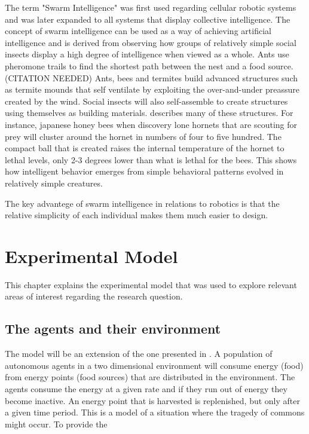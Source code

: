 \documentclass[a4paper]{book}
\begin{document}
The term "Swarm Intelligence" was first used \cite{beni_swarm_1993} regarding cellular robotic systems and was later expanded to all systems that display collective intelligence.
The concept of swarm intelligence can be used as a way of achieving artificial intelligence and is derived from observing how groups of relatively simple social insects display a high degree of intelligence when viewed as a whole. %
Ants use pheromone trails to find the shortest path between the nest and a food source. (CITATION NEEDED) 
Ants, bees and termites build advanced structures such as termite mounds that self ventilate by exploiting the over-and-under preassure created by the wind. 
Social insects will also self-assemble to create structures using themselves as building materials. 
\cite{anderson_self-assemblages_2002} describes many of these structures. 
For instance, japanese honey bees when discovery lone hornets that are scouting for prey will cluster around the hornet in numbers of four to five hundred.
The compact ball that is created raises the internal temperature of the hornet to lethal levels, only 2-3 degrees lower than what is lethal for the bees.
This shows how intelligent behavior emerges from simple behavioral patterns evolved in relatively simple creatures. %

The key advantege of swarm intelligence in relations to robotics is that the relative simplicity of each individual makes them much easier to design. 




\chapter{Experimental Model}

This chapter explains the experimental model that was used to explore relevant areas of interest regarding the research question.

\section{The agents and their environment}

The model will be an extension of the one presented in \cite{montanier_surviving_2011-1}. 
A population of autonomous agents in a two dimensional environment will consume energy (food) from energy points (food sources) that are distributed in the environment.
The agents consume the energy at a given rate and if they run out of energy they become inactive.
An energy point that is harvested is replenished, but only after a given time period.
This is a model of a situation where the tragedy of commons might occur. To provide the 
\end{document}
